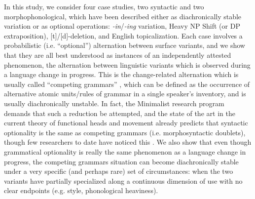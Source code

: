 \documentclass[a4paper,aps,prl,12pt,tightenlines,superscriptaddress]{revtex4}
\begin{document}
In this study, we consider four case studies, two syntactic and two morphophonological, which have been described either as diachronically stable variation or as optional operations: \textsl{-in}/\textsl{-ing} variation, Heavy NP Shift (or DP extraposition), [t]/[d]-deletion, and English topicalization.
Each case involves a probabilistic (i.e. ``optional'') alternation between surface variants, and we show that they are all best understood as instances of an independently attested phenomenon, the alternation between linguistic variants which is observed during a language change in progress.
This is the change-related alternation which is usually called ``competing grammars'' \citep[][]{kroch1989}, which can be defined as the occurrence of alternative atomic units/rules of grammar in a single speaker's inventory, and is usually diachronically unstable.
In fact, the Minimalist research program demands that such a reduction be attempted, and the state of the art in the current  theory of functional heads and movement already predicts that syntactic optionality is the same as competing grammars (i.e. morphosyntactic doublets), though few researchers to date have noticed this \citep[with the exception of][]{kroch1994}.
We also show that even though grammatical optionality is really the same phenomenon as a language change in progress, the competing grammars situation can become diachronically stable under a very specific (and perhaps rare) set of circumstances: when the two variants have partially specialized along a continuous dimension of use with no clear endpoints (e.g. style, phonological heaviness).



\end{document}
